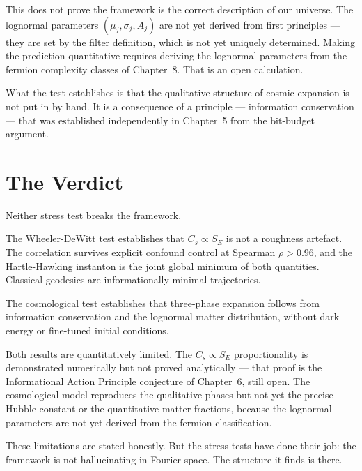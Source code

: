 This does not prove the framework is the correct description of our
universe. The lognormal parameters $(\mu_j, \sigma_j, A_j)$ are not
yet derived from first principles --- they are set by the filter
definition, which is not yet uniquely determined. Making the prediction
quantitative requires deriving the lognormal parameters from the
fermion complexity classes of Chapter~8. That is an open calculation.

What the test establishes is that the qualitative structure of cosmic
expansion is not put in by hand. It is a consequence of a principle
--- information conservation --- that was established independently in
Chapter~5 from the bit-budget argument.

\section{The Verdict}

Neither stress test breaks the framework.

The Wheeler-DeWitt test establishes that $C_s \propto S_E$ is not a
roughness artefact. The correlation survives explicit confound control
at Spearman $\rho > 0.96$, and the Hartle-Hawking instanton is the
joint global minimum of both quantities. Classical geodesics are
informationally minimal trajectories.

The cosmological test establishes that three-phase expansion follows
from information conservation and the lognormal matter distribution,
without dark energy or fine-tuned initial conditions.

Both results are quantitatively limited. The $C_s \propto S_E$
proportionality is demonstrated numerically but not proved analytically
--- that proof is the Informational Action Principle conjecture of
Chapter~6, still open. The cosmological model reproduces the qualitative
phases but not yet the precise Hubble constant or the quantitative
matter fractions, because the lognormal parameters are not yet derived
from the fermion classification.

These limitations are stated honestly. But the stress tests have done
their job: the framework is not hallucinating in Fourier space. The
structure it finds is there.
